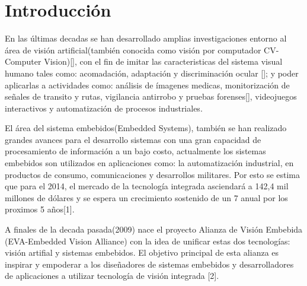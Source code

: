 
\chapter{Introducción}
\label{chp:intro}

En las últimas decadas se han desarrollado amplias investigaciones entorno al área de visión artificial(también conocida como visión por computador CV-Computer Vision)[], con el fin de imitar las caracteristicas del sistema visual humano tales como: acomadación, adaptación y discriminación ocular []; y poder aplicarlas a actividades como: análisis de ímagenes medicas, monitorización de señales de transito y rutas, vigilancia antirrobo y pruebas forenses[], videojuegos interactivos y automatización de procesos industriales. 

El área del sistema embebidos(Embedded Systems), también se han realizado grandes avances para el desarrollo sistemas con una gran capacidad de procesamiento de información a un bajo costo, actualmente los sistemas embebidos son utilizados en aplicaciones como: la automatización industrial, en productos de consumo, comunicaciones y desarrollos militares. Por esto se estima que para el 2014, el mercado de la tecnología integrada asciendará a 142,4 mil millones de dólares y se espera un crecimiento sostenido de un 7 anual por los proximos 5 años[1].



A finales de la decada pasada(2009) nace el proyecto Alianza de Visión Embebida (EVA-Embedded Vision Alliance) con la idea de unificar estas dos tecnologías: visión artifial y sistemas embebidos. El objetivo principal de esta alianza es inspirar y empoderar a los diseñadores de sistemas embebidos y desarrolladores de aplicaciones a utilizar tecnología de visión integrada [2]. 




